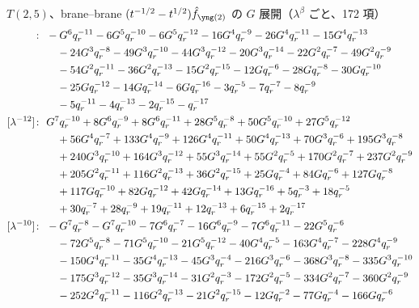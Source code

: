 $T(2,5)$、brane--brane $(t^{-1/2} - t^{1/2})\hat f_{\ytwo}$ の $G$ 展開（$\lambda^\beta$ ごと、172 項）
\begin{align*}
[\lambda^{-14}]\colon\ & -G^{6} \qr^{-11} -6 G^{5} \qr^{-10} -6 G^{5} \qr^{-12} -16 G^{4} \qr^{-9} -26 G^{4} \qr^{-11} -15 G^{4} \qr^{-13} \\
& \quad -24 G^{3} \qr^{-8} -49 G^{3} \qr^{-10} -44 G^{3} \qr^{-12} -20 G^{3} \qr^{-14} -22 G^{2} \qr^{-7} -49 G^{2} \qr^{-9} \\
& \quad -54 G^{2} \qr^{-11} -36 G^{2} \qr^{-13} -15 G^{2} \qr^{-15} -12 G \qr^{-6} -28 G \qr^{-8} -30 G \qr^{-10} \\
& \quad -25 G \qr^{-12} -14 G \qr^{-14} -6 G \qr^{-16} -3 \qr^{-5} -7 \qr^{-7} -8 \qr^{-9} \\
& \quad -5 \qr^{-11} -4 \qr^{-13} -2 \qr^{-15} -\qr^{-17} \\
[\lambda^{-12}]\colon\ & G^{7} \qr^{-10} +8 G^{6} \qr^{-9} +8 G^{6} \qr^{-11} +28 G^{5} \qr^{-8} +50 G^{5} \qr^{-10} +27 G^{5} \qr^{-12} \\
& \quad +56 G^{4} \qr^{-7} +133 G^{4} \qr^{-9} +126 G^{4} \qr^{-11} +50 G^{4} \qr^{-13} +70 G^{3} \qr^{-6} +195 G^{3} \qr^{-8} \\
& \quad +240 G^{3} \qr^{-10} +164 G^{3} \qr^{-12} +55 G^{3} \qr^{-14} +55 G^{2} \qr^{-5} +170 G^{2} \qr^{-7} +237 G^{2} \qr^{-9} \\
& \quad +205 G^{2} \qr^{-11} +116 G^{2} \qr^{-13} +36 G^{2} \qr^{-15} +25 G \qr^{-4} +84 G \qr^{-6} +127 G \qr^{-8} \\
& \quad +117 G \qr^{-10} +82 G \qr^{-12} +42 G \qr^{-14} +13 G \qr^{-16} +5 \qr^{-3} +18 \qr^{-5} \\
& \quad +30 \qr^{-7} +28 \qr^{-9} +19 \qr^{-11} +12 \qr^{-13} +6 \qr^{-15} +2 \qr^{-17} \\
[\lambda^{-10}]\colon\ & -G^{7} \qr^{-8} -G^{7} \qr^{-10} -7 G^{6} \qr^{-7} -16 G^{6} \qr^{-9} -7 G^{6} \qr^{-11} -22 G^{5} \qr^{-6} \\
& \quad -72 G^{5} \qr^{-8} -71 G^{5} \qr^{-10} -21 G^{5} \qr^{-12} -40 G^{4} \qr^{-5} -163 G^{4} \qr^{-7} -228 G^{4} \qr^{-9} \\
& \quad -150 G^{4} \qr^{-11} -35 G^{4} \qr^{-13} -45 G^{3} \qr^{-4} -216 G^{3} \qr^{-6} -368 G^{3} \qr^{-8} -335 G^{3} \qr^{-10} \\
& \quad -175 G^{3} \qr^{-12} -35 G^{3} \qr^{-14} -31 G^{2} \qr^{-3} -172 G^{2} \qr^{-5} -334 G^{2} \qr^{-7} -360 G^{2} \qr^{-9} \\
& \quad -252 G^{2} \qr^{-11} -116 G^{2} \qr^{-13} -21 G^{2} \qr^{-15} -12 G \qr^{-2} -77 G \qr^{-4} -166 G \qr^{-6} \\

\end{align*}
